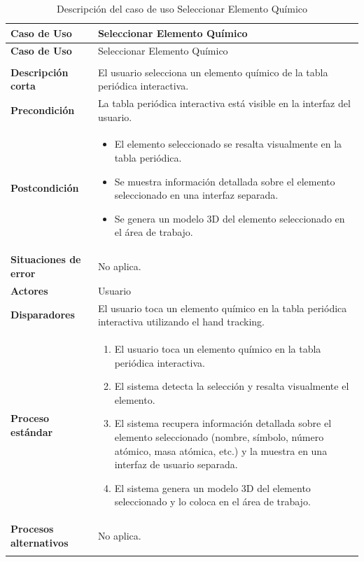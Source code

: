 \begin{longtable}{>{\raggedright\arraybackslash}m{} >{\raggedright\arraybackslash}m{}}
    \toprule\toprule
    \textbf{Caso de Uso} &  Seleccionar Elemento Químico \\
    \midrule\midrule
    \endfirsthead

    \toprule\toprule
    \textbf{Caso de Uso} &  Seleccionar Elemento Químico \\
    \midrule\midrule
    \endhead

    \midrule
    \multicolumn{2}{r}{\textit{Continúa en la siguiente página}} \\
    \midrule
    \endfoot

    \endlastfoot

    \textbf{Descripción corta} &  El usuario selecciona un elemento químico de la tabla periódica interactiva.  \\
    \midrule
    \textbf{Precondición} & La tabla periódica interactiva está visible en la interfaz del usuario.  \\
    \midrule
    \textbf{Postcondición} & 
    \begin{itemize}
        \item El elemento seleccionado se resalta visualmente en la tabla periódica. 
        \item Se muestra información detallada sobre el elemento seleccionado en una interfaz separada. 
        \item Se genera un modelo 3D del elemento seleccionado en el área de trabajo. 
    \end{itemize}\\
    \midrule
    \textbf{Situaciones de error} & No aplica. \\
    \midrule
    \textbf{Actores} & Usuario \\
    \midrule
    \textbf{Disparadores} & El usuario toca un elemento químico en la tabla periódica interactiva utilizando el hand tracking.\\
    \midrule
    \textbf{Proceso estándar} &
    \begin{enumerate}
        \item El usuario toca un elemento químico en la tabla periódica interactiva. 
        \item El sistema detecta la selección y resalta visualmente el elemento. 
        \item El sistema recupera información detallada sobre el elemento seleccionado (nombre, símbolo, número atómico, masa atómica, etc.) y la muestra en una interfaz de usuario separada. 
        \item El sistema genera un modelo 3D del elemento seleccionado y lo coloca en el área de trabajo.  
    \end{enumerate} \\
    \midrule
    \textbf{Procesos alternativos} & No aplica. \\
    \midrule
    \caption{Descripción del caso de uso  Seleccionar Elemento Químico}
    \label{tab:Caso_de_uso_ Balancear_Seleccionar_Elemento_Químico}
\end{longtable}

